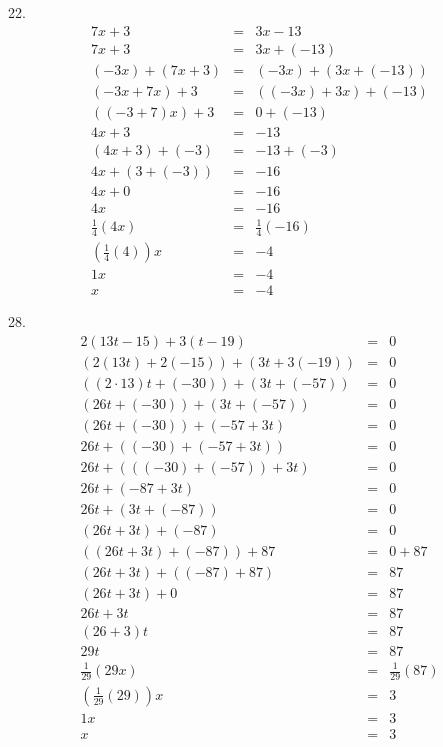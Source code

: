 \documentclass[letterpaper]{article}
\begin{document}
22.
\begin{eqnarray*}
7x+3 &=& 3x-13 \\
7x+3 &=& 3x+(-13) \\
(-3x)+(7x+3) &=& (-3x)+(3x+(-13)) \\
(-3x+7x)+3 &=& ((-3x)+3x)+(-13) \\
((-3+7)x)+3 &=& 0 + (-13) \\
4x+3 &=& -13 \\
(4x+3)+(-3) &=& -13+(-3) \\
4x+(3+(-3)) &=& -16 \\
4x+0 &=& -16 \\
4x &=& -16 \\
\frac{1}{4}(4x) &=& \frac{1}{4}(-16) \\
(\frac{1}{4}(4))x &=& -4 \\
1x &=& -4 \\
x &=& -4
\end{eqnarray*}

28.
\begin{eqnarray*}
2(13t-15)+3(t-19) &=& 0 \\
(2(13t)+2(-15))+(3t+3(-19)) &=& 0 \\
((2\cdot13)t+(-30))+(3t+(-57)) &=& 0 \\
(26t+(-30))+(3t+(-57)) &=& 0 \\
(26t+(-30))+(-57+3t) &=& 0 \\
26t+((-30)+(-57+3t)) &=& 0 \\
26t+(((-30)+(-57))+3t) &=& 0 \\
26t+(-87+3t) &=& 0 \\
26t+(3t+(-87)) &=& 0 \\
(26t+3t)+(-87) &=& 0 \\
((26t+3t)+(-87))+87 &=& 0+87 \\
(26t+3t)+((-87)+87) &=& 87 \\
(26t+3t)+0 &=& 87 \\
26t+3t &=& 87 \\
(26+3)t &=& 87 \\
29t &=& 87 \\
\frac{1}{29}(29x) &=& \frac{1}{29}(87) \\
(\frac{1}{29}(29))x &=& 3 \\
1x &=& 3 \\
x &=& 3
\end{eqnarray*}
\end{document}
